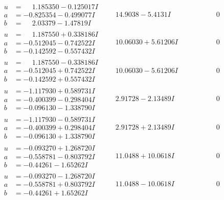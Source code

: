 \documentclass[1p]{elsarticle_modified}
\theoremstyle{definition}
\begin{document}
$$\begin{array}{c|c|c}
\begin{aligned}
u &= \phantom{-}1.185350 - 0.125017 I \\
a &= -0.825354 - 0.499077 I \\
b &= \phantom{-}2.03379 - 1.47819 I\end{aligned}
 & \phantom{-}14.9038 - 5.4131 I & \phantom{-0.000000 } 0 \\ \hline\begin{aligned}
u &= \phantom{-}1.187550 + 0.338186 I \\
a &= -0.512045 - 0.742522 I \\
b &= -0.142592 - 0.557432 I\end{aligned}
 & \phantom{-}10.06030 + 5.61206 I & \phantom{-0.000000 } 0 \\ \hline\begin{aligned}
u &= \phantom{-}1.187550 - 0.338186 I \\
a &= -0.512045 + 0.742522 I \\
b &= -0.142592 + 0.557432 I\end{aligned}
 & \phantom{-}10.06030 - 5.61206 I & \phantom{-0.000000 } 0 \\ \hline\begin{aligned}
u &= -1.117930 + 0.589731 I \\
a &= -0.400399 - 0.298404 I \\
b &= -0.096130 - 1.338790 I\end{aligned}
 & \phantom{-}2.91728 - 2.13489 I & \phantom{-0.000000 } 0 \\ \hline\begin{aligned}
u &= -1.117930 - 0.589731 I \\
a &= -0.400399 + 0.298404 I \\
b &= -0.096130 + 1.338790 I\end{aligned}
 & \phantom{-}2.91728 + 2.13489 I & \phantom{-0.000000 } 0 \\ \hline\begin{aligned}
u &= -0.093270 + 1.268720 I \\
a &= -0.558781 - 0.803792 I \\
b &= -0.44261 - 1.65262 I\end{aligned}
 & \phantom{-}11.0488 + 10.0618 I & \phantom{-0.000000 } 0 \\ \hline\begin{aligned}
u &= -0.093270 - 1.268720 I \\
a &= -0.558781 + 0.803792 I \\
b &= -0.44261 + 1.65262 I\end{aligned}
 & \phantom{-}11.0488 - 10.0618 I & \phantom{-0.000000 } 0\\

\end{array}$$
\end{document}
